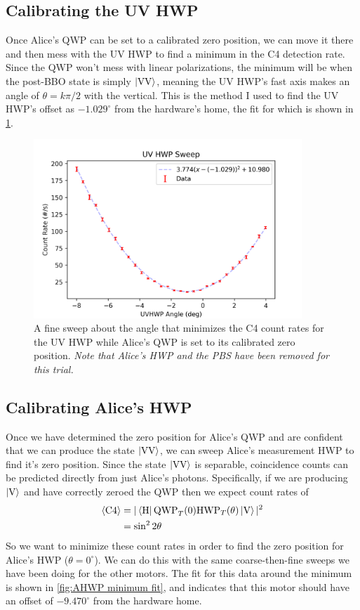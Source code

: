 \documentclass{paper}[11pt]
\begin{document}
	\subsection{Calibrating the UV HWP}
	Once Alice's QWP can be set to a calibrated zero position, we can move it there and then mess with the UV HWP to find a minimum in the C4 detection rate. Since the QWP won't mess with linear polarizations, the minimum will be when the post-BBO state is simply $\ket{\text{VV}}$, meaning the UV HWP's fast axis makes an angle of $\theta=k\pi/2$ with the vertical. This is the method I used to find the UV HWP's offset as $-1.029^\circ$ from the hardware's home, the fit for which is shown in \cref{fig:UVHWP minimum fit}.
	\begin{figure}[p]
		\centering
		\includegraphics[width=0.9\textwidth]{UVHWP/UVHWP_sweep1.png}
		\caption{A fine sweep about the angle that minimizes the C4 count rates for the UV HWP while Alice's QWP is set to its calibrated zero position. \textit{Note that Alice's HWP and the PBS have been removed for this trial.}}
		\label{fig:UVHWP minimum fit}
	\end{figure}
	
	\subsection{Calibrating Alice's HWP}
	Once we have determined the zero position for Alice's QWP and are confident that we can produce the state $\ket{\text{VV}}$, we can sweep Alice's measurement HWP to find it's zero position. Since the state $\ket{\text{VV}}$ is separable, coincidence counts can be predicted directly from just Alice's photons. Specifically, if we are producing $\ket{\text{V}}$ and have correctly zeroed the QWP then we expect count rates of
	\begin{align}
		{\langle{\text{C4}}\rangle}&=|\bra{\text{H}}\text{\rmfamily QWP\normalfont}_T(0)\text{\rmfamily HWP\normalfont}_T(\theta)\ket{\text{V}}|^2 \\
		&= \sin^22\theta
	\end{align}
	So we want to minimize these count rates in order to find the zero position for Alice's HWP ($\theta=0^\circ$). We can do this with the same coarse-then-fine sweeps we have been doing for the other motors. The fit for this data around the minimum is shown in \cref{fig:AHWP minimum fit}, and indicates that this motor should have an offset of $-9.470^\circ$ from the hardware home.
	
\end{document}
